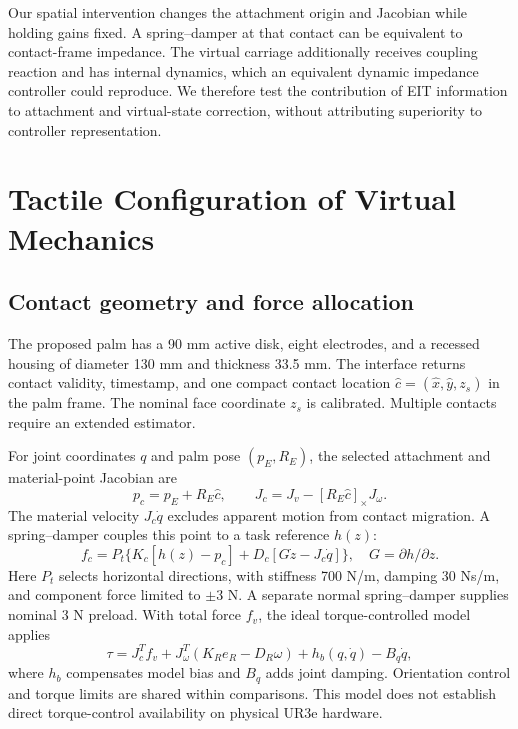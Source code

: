 \documentclass[letterpaper,10pt,conference]{IEEEtran}
\newcommand{\crossmat}[1]{[#1]_{\times}}
\begin{document}
Our spatial intervention changes the attachment origin and Jacobian while holding gains fixed. A spring--damper at that contact can be equivalent to contact-frame impedance. The virtual carriage additionally receives coupling reaction and has internal dynamics, which an equivalent dynamic impedance controller could reproduce. We therefore test the contribution of EIT information to attachment and virtual-state correction, without attributing superiority to controller representation.

\section{Tactile Configuration of Virtual Mechanics}
\subsection{Contact geometry and force allocation}
The proposed palm has a 90 mm active disk, eight electrodes, and a recessed housing of diameter 130 mm and thickness 33.5 mm. The interface returns contact validity, timestamp, and one compact contact location $\hat c=(\hat x,\hat y,z_s)$ in the palm frame. The nominal face coordinate $z_s$ is calibrated. Multiple contacts require an extended estimator.

For joint coordinates $q$ and palm pose $(p_E,R_E)$, the selected attachment and material-point Jacobian are
\begin{equation}
 p_c=p_E+R_E\hat c,\qquad
 J_c=J_v-\crossmat{R_E\hat c}J_\omega.
\end{equation}
The material velocity $J_c\dot q$ excludes apparent motion from contact migration. A spring--damper couples this point to a task reference $h(z)$:
\begin{equation}
 f_c=P_t\{K_c[h(z)-p_c]+D_c[G\dot z-J_c\dot q]\},
 \quad G=\partial h/\partial z.
 \label{eq:coupling}
\end{equation}
Here $P_t$ selects horizontal directions, with stiffness 700 N/m, damping 30 Ns/m, and component force limited to $\pm3$ N. A separate normal spring--damper supplies nominal 3 N preload. With total force $f_v$, the ideal torque-controlled model applies
\begin{equation}
 \tau=J_c^T f_v+J_\omega^T(K_R e_R-D_R\omega)
       +h_b(q,\dot q)-B_q\dot q,
\end{equation}
where $h_b$ compensates model bias and $B_q$ adds joint damping. Orientation control and torque limits are shared within comparisons. This model does not establish direct torque-control availability on physical UR3e hardware.
\end{document}
